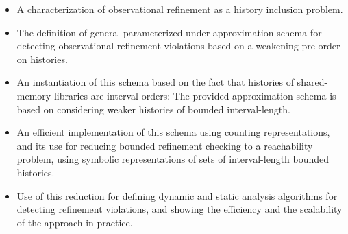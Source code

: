\begin{itemize}

  \item A characterization of observational refinement as a history inclusion
  problem.

  \item The definition of general parameterized under-approximation schema for
  detecting observational refinement violations based on a weakening pre-order
  on histories.

  \item An instantiation of this schema based on the fact that histories of
  shared-memory libraries are interval-orders: The provided approximation
  schema is based on considering weaker histories of bounded interval-length.

  \item An efficient implementation of this schema using counting
  representations, and its use for reducing bounded refinement checking to a
  reachability problem, using symbolic representations of sets of
  interval-length bounded histories.

  \item Use of this reduction for defining dynamic and static analysis
  algorithms for detecting refinement violations, and showing the efficiency
  and the scalability of the approach in practice.

\end{itemize}
